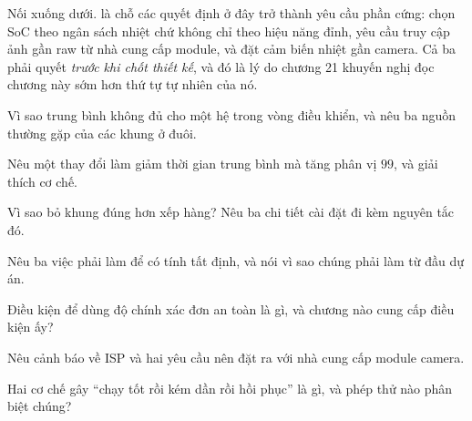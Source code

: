 \documentclass[../../vslam.tex]{subfiles}
\begin{document}
Nối xuống dưới.  là chỗ các quyết định ở đây trở thành yêu cầu phần cứng: chọn SoC theo ngân sách nhiệt chứ không chỉ theo hiệu năng đỉnh, yêu cầu truy cập ảnh gần raw từ nhà cung cấp module, và đặt cảm biến nhiệt gần camera. Cả ba phải quyết \emph{trước khi chốt thiết kế}, và đó là lý do chương 21 khuyến nghị đọc chương này sớm hơn thứ tự tự nhiên của nó.

\begin{tukiem}
\item Vì sao trung bình không đủ cho một hệ trong vòng điều khiển, và nêu ba nguồn thường gặp của các khung ở đuôi.
\item Nêu một thay đổi làm giảm thời gian trung bình mà tăng phân vị \(99\), và giải thích cơ chế.
\item Vì sao bỏ khung đúng hơn xếp hàng? Nêu ba chi tiết cài đặt đi kèm nguyên tắc đó.
\item Nêu ba việc phải làm để có tính tất định, và nói vì sao chúng phải làm từ đầu dự án.
\item Điều kiện để dùng độ chính xác đơn an toàn là gì, và chương nào cung cấp điều kiện ấy?
\item Nêu cảnh báo về ISP và hai yêu cầu nên đặt ra với nhà cung cấp module camera.
\item Hai cơ chế gây ``chạy tốt rồi kém dần rồi hồi phục'' là gì, và phép thử nào phân biệt chúng?
\end{tukiem}
\ifSubfilesClassLoaded{\printbibliography[title={Nguồn}]}{}
\end{document}
